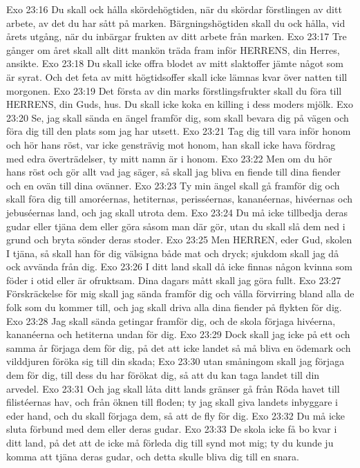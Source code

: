 Exo 23:16  Du skall ock hålla skördehögtiden, när du skördar förstlingen av ditt arbete, av det du har sått på marken. Bärgningshögtiden skall du ock hålla, vid årets utgång, när du inbärgar frukten av ditt arbete från marken.
Exo 23:17  Tre gånger om året skall allt ditt mankön träda fram inför HERRENS, din Herres, ansikte.
Exo 23:18  Du skall icke offra blodet av mitt slaktoffer jämte något som är syrat. Och det feta av mitt högtidsoffer skall icke lämnas kvar över natten till morgonen.
Exo 23:19  Det första av din marks förstlingsfrukter skall du föra till HERRENS, din Guds, hus. Du skall icke koka en killing i dess moders mjölk.
Exo 23:20  Se, jag skall sända en ängel framför dig, som skall bevara dig på vägen och föra dig till den plats som jag har utsett.
Exo 23:21  Tag dig till vara inför honom och hör hans röst, var icke gensträvig mot honom, han skall icke hava fördrag med edra överträdelser, ty mitt namn är i honom.
Exo 23:22  Men om du hör hans röst och gör allt vad jag säger, så skall jag bliva en fiende till dina fiender och en ovän till dina ovänner.
Exo 23:23  Ty min ängel skall gå framför dig och skall föra dig till amoréernas, hetiternas, perisséernas, kananéernas, hivéernas och jebuséernas land, och jag skall utrota dem.
Exo 23:24  Du må icke tillbedja deras gudar eller tjäna dem eller göra såsom man där gör, utan du skall slå dem ned i grund och bryta sönder deras stoder.
Exo 23:25  Men HERREN, eder Gud, skolen I tjäna, så skall han för dig välsigna både mat och dryck; sjukdom skall jag då ock avvända från dig.
Exo 23:26  I ditt land skall då icke finnas någon kvinna som föder i otid eller är ofruktsam. Dina dagars mått skall jag göra fullt.
Exo 23:27  Förskräckelse för mig skall jag sända framför dig och vålla förvirring bland alla de folk som du kommer till, och jag skall driva alla dina fiender på flykten för dig.
Exo 23:28  Jag skall sända getingar framför dig, och de skola förjaga hivéerna, kananéerna och hetiterna undan för dig.
Exo 23:29  Dock skall jag icke på ett och samma år förjaga dem för dig, på det att icke landet så må bliva en ödemark och vilddjuren föröka sig till din skada;
Exo 23:30  utan småningom skall jag förjaga dem för dig, till dess du har förökat dig, så att du kan taga landet till din arvedel.
Exo 23:31  Och jag skall låta ditt lands gränser gå från Röda havet till filistéernas hav, och från öknen till floden; ty jag skall giva landets inbyggare i eder hand, och du skall förjaga dem, så att de fly för dig.
Exo 23:32  Du må icke sluta förbund med dem eller deras gudar.
Exo 23:33  De skola icke få bo kvar i ditt land, på det att de icke må förleda dig till synd mot mig; ty du kunde ju komma att tjäna deras gudar, och detta skulle bliva dig till en snara.
